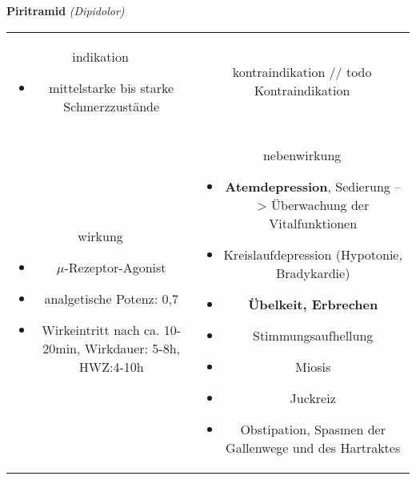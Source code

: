 \begin{frame}{
    \textbf{Piritramid}
    \textit{(Dipidolor)}
}
    \begin{tabular}{c c}
        \begin{beamercolorbox}[wd=\boxwidth\textwidth,ht=\boxheight\textheight,sep=1em]{indikation}
            \begin{itemize}
                \item mittelstarke bis starke Schmerzzustände
            \end{itemize}
        \end{beamercolorbox} & 
        \begin{beamercolorbox}[wd=\boxwidth\textwidth,ht=\boxheight\textheight,sep=1em]{kontraindikation}
        // todo Kontraindikation 
        \end{beamercolorbox} \\
        \begin{beamercolorbox}[wd=\boxwidth\textwidth,ht=\boxheight\textheight,sep=1em]{wirkung}
            \begin{itemize}
                \item $\mu$-Rezeptor-Agonist
                \item analgetische Potenz: 0,7
                \item Wirkeintritt nach ca. 10-20min, Wirkdauer: 5-8h, HWZ:4-10h
            \end{itemize}
        \end{beamercolorbox} & 
        \begin{beamercolorbox}[wd=\boxwidth\textwidth,ht=\boxheight\textheight,sep=1em]{nebenwirkung}
            \begin{itemize}
                \item \textbf{Atemdepression}, Sedierung --> Überwachung der Vitalfunktionen
                \item Kreislaufdepression (Hypotonie, Bradykardie)
                \item \textbf{Übelkeit, Erbrechen}
                \item Stimmungsaufhellung
                \item Miosis
                \item Juckreiz
                \item Obstipation, Spasmen der Gallenwege und des Hartraktes
            \end{itemize}
        \end{beamercolorbox} \\
    \end{tabular}
\end{frame}

